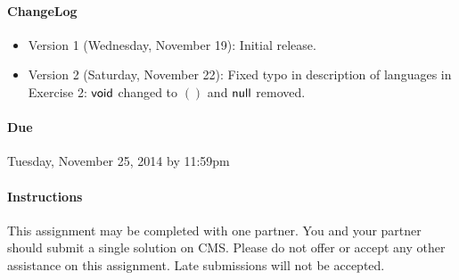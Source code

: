 \documentclass[10pt]{article}
\begin{document}

\paragraph{ChangeLog}
\begin{itemize}
\item Version 1 (Wednesday, November 19): Initial release.
\item Version 2 (Saturday, November 22): Fixed typo in description of languages in Exercise 2: $\mathsf{void}$ changed to $()$ and $\mathsf{null}$ removed.
\end{itemize}


\paragraph{Due} Tuesday, November 25, 2014 by 11:59pm 

\paragraph{Instructions} 
This assignment may be completed with one partner.  You and your
partner should submit a single solution on CMS. Please do not offer or
accept any other assistance on this assignment. Late submissions will
not be accepted.
\end{document}
